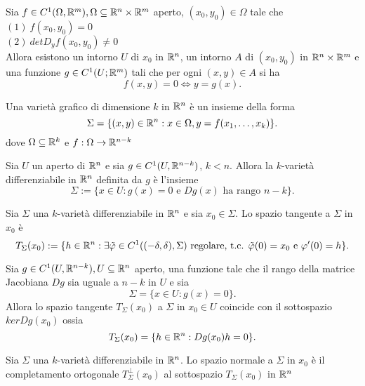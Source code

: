 \documentclass[12px]{article}
\begin{document}
	\begin{teo}
		Sia $f\in C^1(\Omega,\mathbb{R}^m), \Omega\subseteq \mathbb{R}^n\times \mathbb{R}^m$ aperto,  $(x_0,y_0)\in\Omega$ tale che \\
		$(1) \ f(x_0,y_0) = 0$\\
		$(2) \ detD_yf(x_0,y_0)\neq 0$ \\
		Allora esistono un intorno $U$ di $x_0$ in $\mathbb{R}^n$, un intorno  $A$ di $(x_0,y_0)$ in $\mathbb{R}^n\times\mathbb{R}^m$ e una funzione  $g\in C^1(U;\mathbb{R}^m)$ tali che per ogni  $(x,y)\in A$ si ha
		 \[
		f(x,y) = 0 \Leftrightarrow y = g(x)
		.\] 
	\end{teo}
	\begin{defi}
		Una varietà grafico di dimensione $k$ in $\mathbb{R}^n$ è un insieme della forma
		 \[
			 \Sigma = \{(x,y)\in\mathbb{R}^n:x\in\Omega, y = f(x_1,\ldots,x_k)\}
		.\] 
		dove $\Omega\subseteq\mathbb{R}^k$ e $f:\Omega \rightarrow\mathbb{R}^{n-k}$
	\end{defi}
	\begin{defi}
		Sia $U$ un aperto di $\mathbb{R}^n$ e sia $g\in C^1(U,\mathbb{R}^{n-k})$,  $k<n$. Allora la $k$-varietà differenziabile in  $\mathbb{R}^n$ definita da  $g$ è l'insieme
		 \[
			 \Sigma := \{x\in U: g(x) = 0\text{ e }Dg(x)\text{ ha rango } n-k\}
		.\] 
	\end{defi}
	\begin{defi}
		Sia $\Sigma$ una $k$-varietà differenziabile in $\mathbb{R}^n$ e sia $x_0\in\Sigma$. Lo spazio tangente a $\Sigma$ in $x_0$ è
		\[
			T_\Sigma(x_0):=\{h\in\mathbb{R}^n: \exists \tilde \varphi\in C^1((-\delta,\delta),\Sigma)\text{ regolare, t.c. } \tilde \varphi(0) = x_0\text{ e } \varphi'(0) = h\}
		.\] 
	\end{defi}
	\begin{prop}
		Sia $g\in C^1(U,\mathbb{R}^{n-k}),U\subseteq\mathbb{R}^n$ aperto, una funzione tale che il rango della matrice Jacobiana $Dg$ sia uguale a $n-k$ in $U$ e sia
		 \[
			 \Sigma = \{x\in U: g(x) = 0\}
		.\] 
		Allora lo spazio tangente $T_\Sigma (x_0)$ a $\Sigma$ in  $x_0\in U$ coincide con il sottospazio $kerDg(x_0)$ ossia
		\[
			T_\Sigma (x_0) = \{h\in\mathbb{R}^n: Dg(x_0)h = 0\}
		.\] 
	\end{prop}
	\begin{defi}
	Sia $\Sigma$ una $k$-varietà differenziabile in $\mathbb{R}^n$. Lo spazio normale a  $\Sigma$ in $x_0$ è il completamento ortogonale $T^\perp_\Sigma(x_0)$ al sottospazio $T_\Sigma(x_0)$ in $\mathbb{R}^n$
\end{defi}
\end{document}
